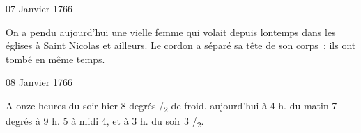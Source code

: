                      \begin{diary}{07 Janvier 1766}{}
                        
                         On a pendu aujourd'hui une vielle
                           femme
                           qui volait depuis lontemps dans les églises
                              à Saint Nicolas et ailleurs. Le cordon a séparé
                           sa tête de son corps ; ils ont tombé en
                           même temps. \bigskip
        
        
                     \end{diary}

                     \begin{diary}{08 Janvier 1766}{}
                        
                         A onze heures du soir hier
                           8 degrés
                              /\textsubscript{2} de
                              froid. aujourd'hui à 4 h. du matin
                           7 degrés à 9 h.
                           5 à midi
                              4, et à
                           3 h. du
                              soir
                           3 /\textsubscript{2}.
                        \bigskip
        
        
                     \end{diary}

